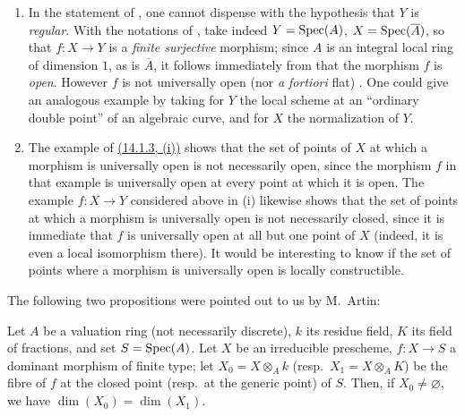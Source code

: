 \begin{remarks}[14.3.9]
\label{IV.14.3.9}
\begin{enumerate}[label=(\roman*)]
  \item In the statement of , one cannot dispense with the hypothesis that $Y$ is \emph{regular}.
  With the notations of , take indeed $Y=\operatorname{Spec}(A)$, $X=\operatorname{Spec}(\overline{A})$, so that $f:X\to Y$ is a \emph{finite surjective} morphism; since $A$ is an integral local ring of dimension $1$, as is $\overline{A}$, it follows immediately from  that the morphism $f$ is \emph{open}.
  However $f$ is not universally open (nor \emph{a fortiori} flat) .
  One could give an analogous example by taking for $Y$ the local scheme at an ``ordinary double point'' of an algebraic curve, and for $X$ the normalization of $Y$.

  \item The example of {\hyperref[IV.14.1.3]{(14.1.3, (i))}} shows that the set of points of $X$ at which a morphism is universally open is not necessarily open, since the morphism $f$ in that example is universally open at every point at which it is open.
  The example $f:X\to Y$ considered above in (i) likewise shows that the set of points at which a morphism is universally open is not necessarily closed, since it is immediate that $f$ is universally open at all but one point of $X$ (indeed, it is even a local isomorphism there).
  It would be interesting to know if the set of points where a morphism is universally open is locally constructible.
\end{enumerate}
\end{remarks}

The following two propositions were pointed out to us by M.\ Artin:

\begin{lemma}[14.3.10]
\label{IV.14.3.10}
Let $A$ be a valuation ring (not necessarily discrete), $k$ its residue field, $K$ its field of fractions, and set $S=\operatorname{Spec}(A)$.
Let $X$ be an irreducible prescheme, $f:X\to S$ a dominant morphism of finite type; let $X_0=X\otimes_A k$ (resp.\ $X_1=X\otimes_A K$) be the fibre of $f$ at the closed point (resp.\ at the generic point) of $S$.
Then, if $X_0\neq\varnothing$, we have $\dim(X_0)=\dim(X_1)$.
\end{lemma}

